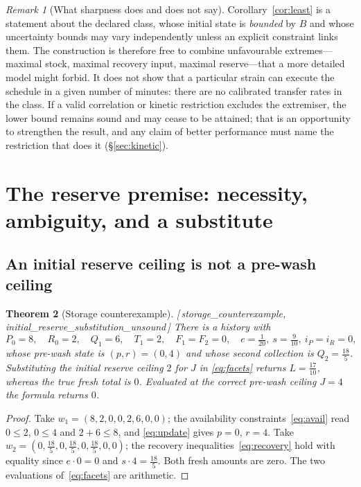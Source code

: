 \documentclass[11pt]{article}
\theoremstyle{plain}
\newtheorem{theorem}{Theorem}[section]
\theoremstyle{definition}
\theoremstyle{remark}
\newtheorem{remark}[theorem]{Remark}
\newcommand{\leanref}[1]{{\normalfont\sffamily\footnotesize[\,#1\,]}}
\newcommand{\Lc}{L}
\begin{document}
\begin{remark}[What sharpness does and does not say]\label{rem:sharp}
Corollary~\ref{cor:least} is a statement about the declared class, whose
initial state is \emph{bounded} by $B$ and whose uncertainty bounds may vary
independently unless an explicit constraint links them. The construction is
therefore free to combine unfavourable extremes---maximal stock, maximal
recovery input, maximal reserve---that a more detailed model might forbid. It
does not show that a particular strain can execute the schedule in a given
number of minutes: there are no calibrated transfer rates in the class. If a
valid correlation or kinetic restriction excludes the extremiser, the lower
bound remains sound and may cease to be attained; that is an opportunity to
strengthen the result, and any claim of better performance must name the
restriction that does it (\S\ref{sec:kinetic}).
\end{remark}

\section{The reserve premise: necessity, ambiguity, and a substitute}
\label{sec:reserve}

\subsection{An initial reserve ceiling is not a pre-wash ceiling}

\begin{theorem}[Storage counterexample]\label{thm:storage}
\leanref{storage\_counterexample, initial\_reserve\_substitution\_unsound}
There is a history with
\[
 P_0=8,\quad R_0=2,\quad Q_1=6,\quad T_1=2,\quad
 F_1=F_2=0,\quad e=\tfrac1{20},\ s=\tfrac9{10},\ i_P=i_R=0,
\]
whose pre-wash state is $(p,r)=(0,4)$ and whose second collection is
$Q_2=\tfrac{18}5$. Substituting the initial reserve ceiling $2$ for $J$ in
\eqref{eq:facets} returns $\Lc=\tfrac{17}{10}$, whereas the true fresh total
is $0$. Evaluated at the correct pre-wash ceiling $J=4$ the formula returns
$0$.
\end{theorem}

\begin{proof}
Take $w_1=(8,2,0,0,2,6,0,0)$; the availability
constraints~\eqref{eq:avail} read $0\le2$, $0\le4$ and $2+6\le8$, and
\eqref{eq:update} gives $p=0$, $r=4$. Take
$w_2=(0,\tfrac{18}5,0,\tfrac{18}5,0,\tfrac{18}5,0,0)$; the recovery
inequalities~\eqref{eq:recovery} hold with equality since
$e\cdot0=0$ and $s\cdot4=\tfrac{18}5$. Both fresh amounts are zero. The two
evaluations of~\eqref{eq:facets} are arithmetic.
\end{proof}
\end{document}

